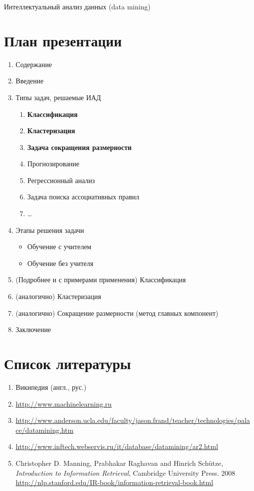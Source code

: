 \documentclass[12pt, a4paper]{article}
\begin{document}
\begin{center}
   \Large{Интеллектуальный анализ данных}
   \Large{(data mining)}
\end{center}

\section*{План презентации}

\begin{enumerate}
   \item Содержание
   \item Введение

   \item Типы задач, решаемые ИАД
      \begin{enumerate}
         \item \textbf{Классификация}
         \item \textbf{Кластеризация}
	 \item \textbf{Задача сокращения размерности}
         \item Прогнозирование
	 \item Регрессионный анализ
         \item Задача поиска ассоциативных правил
	 \item \ldots
      \end{enumerate}

   \item Этапы решения задачи
      \begin{itemize}
         \item Обучение с учителем
         \item Обучение без учителя
      \end{itemize}

   \item (Подробнее и с примерами применения) Классификация
   \item (аналогично) Кластеризация
   \item (аналогично) Сокращение размерности (метод главных компонент)

   \item Заключение
\end{enumerate}

\section*{Список литературы}

\begin{enumerate}
   \item Википедия (англ., рус.)
   \item \url{http://www.machinelearning.ru}
   \item \url{http://www.anderson.ucla.edu/faculty/jason.frand/teacher/technologies/palace/datamining.htm}
   \item \url{http://www.inftech.webservis.ru/it/database/datamining/ar2.html}
   \item Christopher D. Manning, Prabhakar Raghavan and Hinrich Schütze, \emph{Introduction to Information Retrieval}, Cambridge University Press. 2008
         \url{http://nlp.stanford.edu/IR-book/information-retrieval-book.html}
\end{enumerate}
\end{document}
